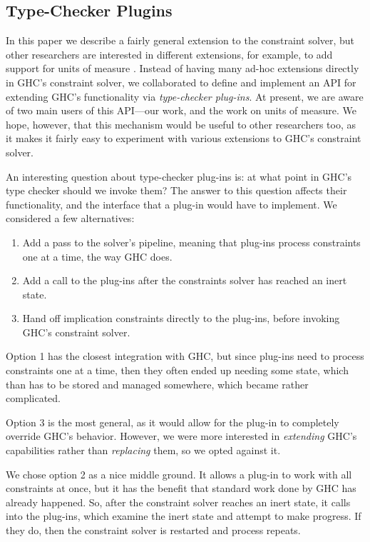 \documentclass{sigplanconf}
\begin{document}
\subsection{Type-Checker Plugins}
In this paper we describe a fairly general extension to the constraint
solver, but other researchers are interested in different extensions,
for example, to add support for units of measure \cite{units-of-measure}.
Instead of having many
ad-hoc extensions directly
in GHC's constraint solver, we collaborated to define and implement an
API for extending GHC's functionality via {\em type-checker plug-ins}.
At present, we are aware of two main
users of this API---our work, and the work on units of measure. We
hope, however, that this mechanism would be useful to other researchers too,
as it makes it fairly easy to experiment with various extensions to
GHC's constraint solver.

An interesting question about type-checker plug-ins is: at what point in
GHC's type checker should we invoke them?  The answer to this question
affects their functionality, and the interface that a plug-in would have
to implement.  We considered a few alternatives:
\begin{enumerate}
\item Add a pass to the solver's pipeline, meaning that plug-ins process
constraints one at a time, the way GHC does.
\item Add a call to the plug-ins after the constraints solver has reached
an inert state.
\item Hand off implication constraints directly to the plug-ins,
before invoking GHC's constraint solver.
\end{enumerate}

Option 1 has the closest integration with GHC, but since plug-ins need
to process constraints one at a time, then they often ended up needing
some state, which than has to be stored and managed somewhere,
which became rather complicated.

Option 3 is the most general, as it
would allow for the plug-in to completely override GHC's behavior.  However,
we were more interested in {\em extending} GHC's capabilities rather than
{\em replacing} them, so we opted against it.

We chose option 2 as a nice middle ground. It allows a plug-in to
work with all constraints at once, but it has the benefit that standard work
done by GHC has already happened. So, after the constraint
solver reaches an inert state, it calls into the plug-ins, which examine
the inert state and attempt to make progress.  If they do, then the
constraint solver is restarted and process repeats.
\end{document}

